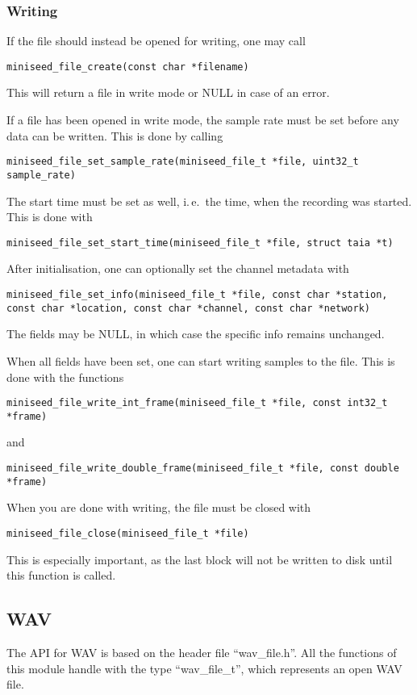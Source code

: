\documentclass[DIV=10, parskip=half]{scrartcl}
\renewenvironment{quote}
{\list{}{
  \setlength{\rightmargin}{0cm}
  \setlength{\leftmargin}{0.75cm}}%
\item\relax\ignorespaces}
{\unskip\unskip\endlist}
\newcommand{\docline}[1]{%
  \begin{quote}
  \raggedright\texttt{#1}
  \end{quote}
}
\begin{document}
\subsubsection{Writing}

If the file should instead be opened for writing, one may call
\docline{miniseed\_file\_create(const char *filename)}
This will return a file in write mode or NULL in case of an error.

If a file has been opened in write mode, the sample rate must be set before any data can be written.
This is done by calling
\docline{miniseed\_file\_set\_sample\_rate(miniseed\_file\_t *file, uint32\_t sample\_rate)}

The start time must be set as well, i.\,e.\ the time, when the recording was started.
This is done with
\docline{miniseed\_file\_set\_start\_time(miniseed\_file\_t *file, struct taia *t)}

After initialisation, one can optionally set the channel metadata with
\docline{miniseed\_file\_set\_info(miniseed\_file\_t *file, const char *station, const char *location, const char *channel, const char *network)}
The fields may be NULL, in which case the specific info remains unchanged.

When all fields have been set, one can start writing samples to the file.
This is done with the functions
\docline{miniseed\_file\_write\_int\_frame(miniseed\_file\_t *file, const int32\_t *frame)}
and
\docline{miniseed\_file\_write\_double\_frame(miniseed\_file\_t *file, const double *frame)}

When you are done with writing, the file must be closed with
\docline{miniseed\_file\_close(miniseed\_file\_t *file)}
This is especially important, as the last block will not be written to disk until this function is called.

\subsection{WAV}

The API for WAV is based on the header file “wav\_file.h”.
All the functions of this module handle with the type “wav\_file\_t”, which represents an open WAV file.
\end{document}
